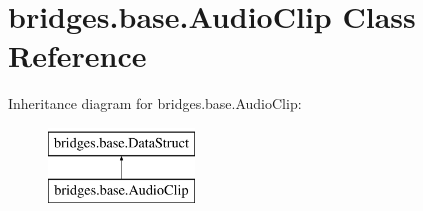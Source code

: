 \hypertarget{classbridges_1_1base_1_1_audio_clip}{}\section{bridges.\+base.\+Audio\+Clip Class Reference}
\label{classbridges_1_1base_1_1_audio_clip}
Inheritance diagram for bridges.\+base.\+Audio\+Clip\+:\begin{figure}[H]
\begin{center}
\leavevmode
\includegraphics[height=2.000000cm]{classbridges_1_1base_1_1_audio_clip}
\end{center}
\end{figure}
